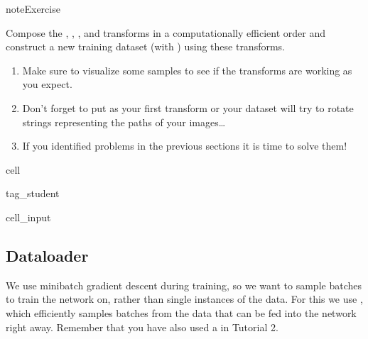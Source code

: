\documentclass[letterpaper,10pt,english]{jupyterBook}
\begin{document}
\begin{sphinxadmonition}{note}{Exercise}

\sphinxAtStartPar
Compose the , , ,  and  transforms in a computationally efficient order and construct a new training dataset (with ) using these transforms.
\begin{enumerate}
%
\item {} 
\sphinxAtStartPar
Make sure to visualize some samples to see if the transforms are working as you expect.

\item {} 
\sphinxAtStartPar
Don’t forget to put  as your first transform or your dataset will try to rotate strings representing the paths of your images…

\item {} 
\sphinxAtStartPar
If you identified problems in the previous sections it is time to solve them!

\end{enumerate}
\end{sphinxadmonition}

\begin{sphinxuseclass}{cell}
\begin{sphinxuseclass}{tag_student}\begin{sphinxVerbatimInput}

\begin{sphinxuseclass}{cell_input}
\begin{sphinxVerbatim}[commandchars=\\\{\}]
\end{sphinxVerbatim}

\end{sphinxuseclass}\end{sphinxVerbatimInput}

\end{sphinxuseclass}
\end{sphinxuseclass}

\subsection{Dataloader}
\label{\detokenize{notebooks/Tutorial3_Segmentation/Tutorial3_Segmentation_student:dataloader}}
\sphinxAtStartPar
We use mini\sphinxhyphen{}batch gradient descent during training, so we want to sample batches to train the network on, rather than single instances of the data. For this we use , which efficiently samples batches from the data that can be fed into the network right away. Remember that you have also used a  in Tutorial 2.
\end{document}
